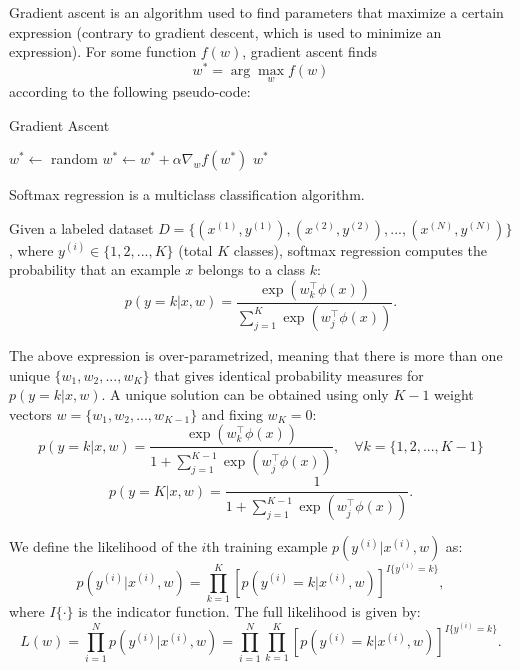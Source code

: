 \documentclass[lang=cn,11pt]{elegantbook}
\begin{document}
Gradient ascent is an algorithm used to find parameters that maximize a certain expression (contrary to
gradient descent, which is used to minimize an expression). For some function $f(w)$, gradient ascent finds
\begin{equation}
    w^* = \arg\max_w f(w)
\end{equation}
according to the following pseudo-code:

\begin{algorithm}
\caption{Gradient Ascent}
\begin{algorithmic}[1]
    \State $w^* \gets$ random
    \Repeat
        \State $w^* \gets w^* + \alpha \nabla_w f(w^*)$
    \State \Return $w^*$
\end{algorithmic}
\end{algorithm}

Softmax regression is a multiclass classification algorithm. 

Given a labeled dataset \(D = \{(x^{(1)}, y^{(1)}), (x^{(2)}, y^{(2)}), ..., (x^{(N)}, y^{(N)})\}\), where $y^{(i)} \in \{1, 2, ...,K\}$ (total $K$ classes), softmax regression computes the probability that an example $x$ belongs to a class $k$:
\begin{equation}
    p(y = k | x, w) = \frac{\exp(w_k^\top \phi(x))}{\sum_{j=1}^{K} \exp(w_j^\top \phi(x))}.
\end{equation}

The above expression is over-parametrized, meaning that there is more than one unique $\{w_1,w_2, ...,w_K\}$ that gives identical probability measures for $p(y = k|x,w)$. A unique solution can be obtained using only $K-1$ weight vectors $w = \{w_1,w_2, ...,w_{K-1}\}$ and fixing $w_K = 0$:
\begin{equation}
    p(y = k|x,w) = \frac{\exp(w_k^\top \phi(x))}{1 + \sum_{j=1}^{K-1} \exp(w_j^\top \phi(x))}, \quad \forall k = \{1, 2, ...,K - 1\}
\end{equation}
\begin{equation}
    p(y = K|x,w) = \frac{1}{1 + \sum_{j=1}^{K-1} \exp(w_j^\top \phi(x))}.
\end{equation}

We define the likelihood of the $i$th training example $p(y^{(i)}|x^{(i)},w)$ as:
\begin{equation}
    p(y^{(i)}|x^{(i)},w) = \prod_{k=1}^{K} \left[ p(y^{(i)} = k|x^{(i)},w) \right]^{I\{y^{(i)}=k\}},
\end{equation}
where $I\{\cdot\}$ is the indicator function. The full likelihood is given by:
\begin{equation}
    L(w) = \prod_{i=1}^{N} p(y^{(i)}|x^{(i)},w) = \prod_{i=1}^{N} \prod_{k=1}^{K} \left[ p(y^{(i)} = k|x^{(i)},w) \right]^{I\{y^{(i)}=k\}}.
\end{equation}
\end{document}
